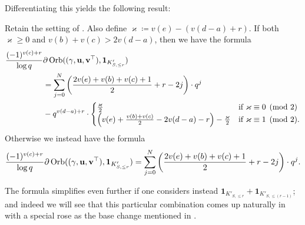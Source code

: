 Differentiating this yields the following result:
\begin{corollary}
  \label{cor:semi_lie_derivative_single}
  Retain the setting of .
  Also define $\varkappa \coloneqq v(e) - (v(d-a)+r)$.
  If both $\varkappa \ge 0$ and $v(b) + v(c) > 2v(d-a)$, then we have the formula
  \begin{align*}
    \frac{(-1)^{v(c)+r}}{\log q}
    &\partial \operatorname{Orb}({(\gamma, \mathbf u, \mathbf v^\top)}, \mathbf{1}_{K'_{S, \le r}}) \\
    &= \sum_{j=0}^N \left( \frac{2v(e)+v(b)+v(c)+1}{2} + r - 2j \right) \cdot q^j \\
    & - q^{v(d-a)+r} \cdot
    \begin{cases}
      \frac{\varkappa}{2} & \text{if }\varkappa \equiv 0 \pmod 2 \\
      \left( v(e)+\frac{v(b)+v(c)}{2}-2v(d-a)-r \right) - \frac{\varkappa}{2}
      & \text{if }\varkappa \equiv 1 \pmod 2.
    \end{cases}
  \end{align*}
  Otherwise we instead have the formula
  \[
    \frac{(-1)^{v(c)+r}}{\log q}
    \partial \operatorname{Orb}({(\gamma, \mathbf u, \mathbf v^\top)}, \mathbf{1}_{K'_{S, \le r}}) \\
    = \sum_{j=0}^N \left( \frac{2v(e)+v(b)+v(c)+1}{2} + r - 2j \right) \cdot q^j.
  \]
\end{corollary}

The formula simplifies even further if one considers instead
$\mathbf{1}_{K'_{S, \le r}} + \mathbf{1}_{K'_{S, \le (r-1)}}$;
and indeed we will see that this particular combination
comes up naturally in  with a special rose
as the base change mentioned in \cite[Lemma 7.1.1]{ref:AFLspherical}.

